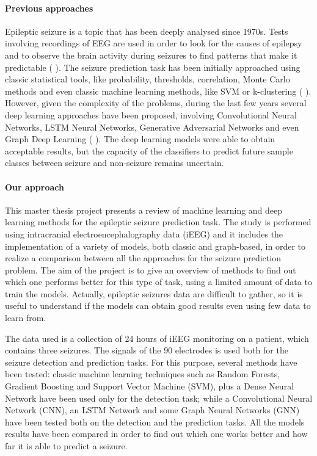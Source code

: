 \paragraph{Previous approaches} Epileptic seizure is a topic that has been deeply analysed since 1970s. Tests involving recordings of EEG are used in order to look for the causes of epilepsy and to observe the brain activity during seizures to find patterns that make it predictable (\cite{LancetNeurol:Seizurelikelihood} \cite{CurrOpinNeurol:Preseizure}). The seizure prediction task has been initially approached using classic statistical tools, like probability, thresholds, correlation, Monte Carlo methods and even classic machine learning methods, like SVM or k-clustering (\cite{Brain:Longroad} \cite{JClinNeurophysiol:stateoftheart} \cite{IEEE:nonlineareeg} \cite{ClinicalNeurophysiology:chance} \cite{NeuroscienceMethod:therapeuticdevices} \cite{arXiv:VLSIBCISystem} \cite{ComputMathMethodsMed:mlmethods}). However, given the complexity of the problems, during the last few years several deep learning approaches have been proposed, involving Convolutional Neural Networks, LSTM Neural Networks, Generative Adversarial Networks and even Graph Deep Learning (\cite{CurrOpinNeurol:review} \cite{arXiv:earlyseizuredetection} \cite{IEEE:graphtheory} \cite{NeuralNetworks:cnn} \cite{arXiv:quantitativeanalysis} \cite{arXiv:gan}). The deep learning models were able to obtain acceptable results, but the capacity of the classifiers to predict future sample classes between seizure and non-seizure remains uncertain.

\paragraph{Our approach} This master thesis project presents a review of machine learning and deep learning methods for the epileptic seizure prediction task. The study is performed using intracranial electroencephalography data (iEEG) and it includes the implementation of a variety of models, both classic and graph-based, in order to realize a comparison between all the approaches for the seizure prediction problem. The aim of the project is to give an overview of methods to find out which one performs better for this type of task, using a limited amount of data to train the models. Actually, epileptic seizures data are difficult to gather, so it is useful to understand if the models can obtain good results even using few data to learn from.

The data used is a collection of 24 hours of iEEG monitoring on a patient, which contains three seizures. The signals of the 90 electrodes is used both for the seizure detection and prediction tasks. For this purpose, several methods have been tested: classic machine learning techniques such as Random Forests, Gradient Boosting and Support Vector Machine (SVM), plus a Dense Neural Network have been used only for the detection task; while a Convolutional Neural Network (CNN), an LSTM Network and some Graph Neural Networks (GNN) have been tested both on the detection and the prediction tasks. All the models results have been compared in order to find out which one works better and how far it is able to predict a seizure.

